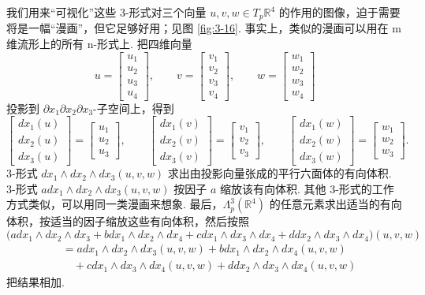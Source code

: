 我们用来``可视化''这些 3-形式对三个向量 $u,v,w\in T_p\mathbb{R}^4$ 的作用的图像，迫于需要将是一幅``漫画''，但它足够好用；见图 \ref{fig:3-16}. 事实上，类似的漫画可以用在 m 维流形上的所有 n-形式上. 把四维向量
\[
u=\begin{bmatrix}u_1\\u_2\\u_3\\u_4\end{bmatrix},\qquad
v=\begin{bmatrix}v_1\\v_2\\v_3\\v_4\end{bmatrix},\qquad
w=\begin{bmatrix}w_1\\w_2\\w_3\\w_4\end{bmatrix}
\]
投影到 $\partial x_1\partial x_2\partial x_3$-子空间上，得到
\[
\begin{bmatrix}dx_1(u)\\dx_2(u)\\dx_3(u)\end{bmatrix}
=\begin{bmatrix}u_1\\u_2\\u_3\end{bmatrix},\qquad
\begin{bmatrix}dx_1(v)\\dx_2(v)\\dx_3(v)\end{bmatrix}
=\begin{bmatrix}v_1\\v_2\\v_3\end{bmatrix},\qquad
\begin{bmatrix}dx_1(w)\\dx_2(w)\\dx_3(w)\end{bmatrix}
=\begin{bmatrix}w_1\\w_2\\w_3\end{bmatrix}.
\]
3-形式 $dx_1\wedge dx_2\wedge dx_3(u,v,w)$ 求出由投影向量张成的平行六面体的有向体积. 3-形式 $adx_1\wedge dx_2\wedge dx_3(u,v,w)$ 按因子 $a$ 缩放该有向体积. 其他 3-形式的工作方式类似，可以用同一类漫画来想象. 最后，$\Lambda_p^3(\mathbb{R}^4)$ 的任意元素求出适当的有向体积，按适当的因子缩放这些有向体积，然后按照
\[
\bigl(adx_1\wedge dx_2\wedge dx_3+bdx_1\wedge dx_2\wedge dx_4+cdx_1\wedge dx_3\wedge dx_4+ddx_2\wedge dx_3\wedge dx_4\bigr)(u,v,w)
\]
\begin{align*}
&=adx_1\wedge dx_2\wedge dx_3(u,v,w)+bdx_1\wedge dx_2\wedge dx_4(u,v,w)\\
&\quad+cdx_1\wedge dx_3\wedge dx_4(u,v,w)+ddx_2\wedge dx_3\wedge dx_4(u,v,w)
\end{align*}
把结果相加.

